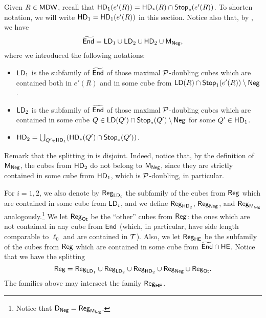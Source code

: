 
Given $R\in{\mathsf{MDW}}$, recall that
${\mathsf{HD}}_1(e'(R))={\mathsf{HD}}_*(R)\cap{\mathsf {Stop}}_*(e'(R))$. 
To shorten notation, we will write ${\mathsf{HD}}_1={\mathsf{HD}}_1(e'(R))$ in this section.
Notice also that, by , we have
\begin{equation}\label{eqsplit71}
{\widetilde{{\mathsf{End}}}} =  {\mathsf{LD}}_1 \cup {\mathsf{LD}}_2  \cup {\mathsf{HD}}_2\cup {\mathsf{M}}_{\mathsf{Neg}},
\end{equation}
where we introduced the following notations:
\begin{itemize}
\item ${\mathsf{LD}}_1$ is the subfamily of ${\widetilde{{\mathsf{End}}}}$ of those maximal ${\mathcal P}$-doubling cubes which are contained both in $e'(R)$ and in some cube from ${\mathsf{LD}}(R)\cap{\mathsf {Stop}}_1(e'(R))\setminus {\mathsf{Neg}}$.

\item ${\mathsf{LD}}_2$ is the subfamily of ${\widetilde{{\mathsf{End}}}}$ of those maximal ${\mathcal P}$-doubling cubes which are contained in some cube
$Q\in {\mathsf{LD}}(Q')\cap {\mathsf {Stop}}_*(Q')\setminus {\mathsf{Neg}}$ for some $Q'\in {\mathsf{HD}}_1$.
\item ${\mathsf{HD}}_2= \bigcup_{Q'\in{\mathsf{HD}}_1}({\mathsf{HD}}_*(Q')\cap{\mathsf {Stop}}_*(Q'))$.
\end{itemize}
Remark that the splitting in  is disjoint. Indeed, notice that, by the definition
of ${\mathsf{M}}_{\mathsf{Neg}}$, the cubes from ${\mathsf{HD}}_2$ do not belong to ${\mathsf{M}}_{\mathsf{Neg}}$, since they are strictly contained in some cube from ${\mathsf{HD}}_1$, which is ${\mathcal P}$-doubling, in particular.

For $i=1,2$, we also denote by ${\mathsf{Reg}}_{{\mathsf{LD}}_i}$ the subfamily of the cubes from ${\mathsf{Reg}}$ which are contained in some cube from ${\mathsf{LD}}_i$, and we define ${\mathsf{Reg}}_{{\mathsf{HD}}_2}$, ${\mathsf{Reg}}_{\mathsf{Neg}}$, and
${\mathsf{Reg}}_{{\mathsf{M}}_{\mathsf{Neg}}}$ analogously.\footnote{Notice that ${\mathsf{D}}_{\mathsf{Neg}}={\mathsf{Reg}}_{{\mathsf{M}}_{\mathsf{Neg}}}$.}
We let ${\mathsf{Reg}}_{\mathsf{Ot}}$ be the ``other'' cubes from ${\mathsf{Reg}}$: the ones which are not contained in any cube from ${\mathsf{End}}$ (which, in particular, have side length comparable to $\ell_0$ and are contained in ${\mathcal T}$).
Also, we let ${\mathsf{Reg}}_{{\mathsf {HE}}}$ be the subfamily of the cubes from ${\mathsf{Reg}}$ which are contained in some cube from ${\widetilde{{\mathsf{End}}}}\cap{\mathsf {HE}}$. Notice that we have the splitting
\begin{equation}\label{eqsplitreg0}
{\mathsf{Reg}} = {\mathsf{Reg}}_{{\mathsf{LD}}_1} \cup  {\mathsf{Reg}}_{{\mathsf{LD}}_2}\cup {\mathsf{Reg}}_{{\mathsf{HD}}_2}\cup {\mathsf{Reg}}_{{\mathsf{Neg}}}\cup {\mathsf{Reg}}_{{\mathsf{Ot}}}.
\end{equation}
The families above may intersect the family ${\mathsf{Reg}}_{{\mathsf {HE}}}$.

